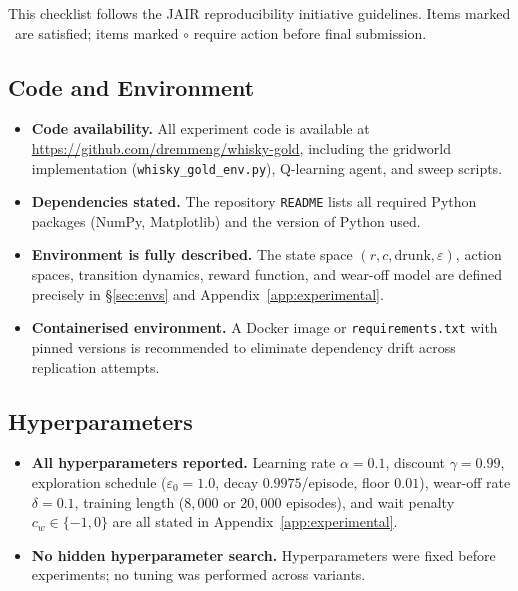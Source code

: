 \documentclass[manuscript, screen, review]{jair}
\begin{document}
This checklist follows the JAIR reproducibility initiative guidelines.
Items marked \checkmark\ are satisfied; items marked $\circ$ require
action before final submission.

\subsection*{Code and Environment}
\begin{itemize}[noitemsep]
  \item[\checkmark] \textbf{Code availability.}
    All experiment code is available at
    \url{https://github.com/dremmeng/whisky-gold}, including the
    gridworld implementation (\texttt{whisky\_gold\_env.py}), Q-learning
    agent, and sweep scripts.
  \item[\checkmark] \textbf{Dependencies stated.}
    The repository \texttt{README} lists all required Python packages
    (NumPy, Matplotlib) and the version of Python used.
  \item[\checkmark] \textbf{Environment is fully described.}
    The state space $(r, c, \mathrm{drunk}, \varepsilon)$, action spaces,
    transition dynamics, reward function, and wear-off model are defined
    precisely in \S\ref{sec:envs} and Appendix~\ref{app:experimental}.
  \item[$\circ$] \textbf{Containerised environment.}
    A Docker image or \texttt{requirements.txt} with pinned versions is
    recommended to eliminate dependency drift across replication attempts.
\end{itemize}

\subsection*{Hyperparameters}
\begin{itemize}[noitemsep]
  \item[\checkmark] \textbf{All hyperparameters reported.}
    Learning rate $\alpha=0.1$, discount $\gamma=0.99$, exploration
    schedule ($\varepsilon_0=1.0$, decay $0.9975$/episode, floor $0.01$),
    wear-off rate $\delta=0.1$, training length ($8{,}000$ or $20{,}000$
    episodes), and wait penalty $c_w \in \{-1, 0\}$ are all stated in
    Appendix~\ref{app:experimental}.
  \item[\checkmark] \textbf{No hidden hyperparameter search.}
    Hyperparameters were fixed before experiments; no tuning was performed
    across variants.
\end{itemize}
\end{document}
